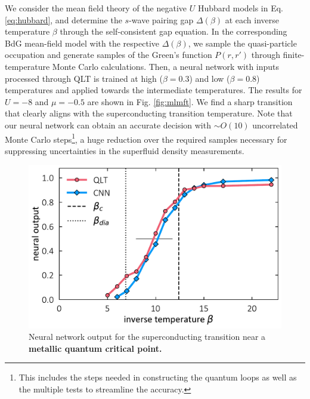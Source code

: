 \documentclass[amsmath,amssymb, aps, prl, twocolumn]{revtex4-1}
\begin{document}
We consider the mean field theory of the negative $U$ Hubbard models in Eq. \ref{eq:hubbard}, and determine the $s$-wave pairing gap $\Delta(\beta)$ at each inverse temperature $\beta$ through the self-consistent gap equation. In the corresponding BdG mean-field model with the respective $\Delta(\beta)$, we sample the quasi-particle occupation and generate samples of the Green's function $P(r,r')$ through finite-temperature Monte Carlo calculations. Then, a neural network with inputs processed through QLT is trained at  high ($\beta=0.3$) and low ($\beta=0.8$) temperatures and applied towards the intermediate temperatures. The results for $U=-8$ and $\mu=-0.5$ are shown in Fig. \ref{fig:mlmft}. We find a sharp transition that clearly aligns with the superconducting transition temperature. Note that our neural network can obtain an accurate decision with $\sim O(10)$ uncorrelated Monte Carlo steps\footnote{This includes the steps needed in constructing the quantum loops as well as the multiple tests to streamline the accuracy.}, a huge reduction over the required samples necessary for suppressing uncertainties in the superfluid density measurements\cite{Hong2016, Erez2016}. 

\begin{figure}
\includegraphics[scale=.43]{fig3.pdf}
\caption{Neural network output for the superconducting transition near a {\bf metallic quantum critical point.}}
\label{fig:afmetal}
\end{figure}
\end{document}
